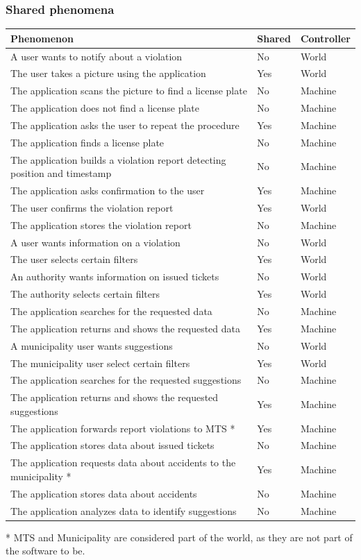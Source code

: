 \documentclass[a4paper]{article}
\begin{document}
\subsubsection{Shared phenomena}

\begin{table}[H]
\centering
\begin{tabularx}{\textwidth}{|X|l|l|}
\hline
Phenomenon & Shared & Controller\tabularnewline
\hline
A user wants to notify about a violation & No & World\tabularnewline
The user takes a picture using the application & Yes &
World\tabularnewline
The application scans the picture to find a license plate & No &
Machine\tabularnewline
The application does not find a license plate & No &
Machine\tabularnewline
The application asks the user to repeat the procedure & Yes &
Machine\tabularnewline
The application finds a license plate & No & Machine\tabularnewline
The application builds a violation report detecting position and
timestamp & No & Machine\tabularnewline
The application asks confirmation to the user & Yes &
Machine\tabularnewline
The user confirms the violation report & Yes & World\tabularnewline
The application stores the violation report & No &
Machine\tabularnewline
A user wants information on a violation & No & World\tabularnewline
The user selects certain filters & Yes & World\tabularnewline
An authority wants information on issued tickets & No &
World\tabularnewline
The authority selects certain filters & Yes & World\tabularnewline
The application searches for the requested data & No &
Machine\tabularnewline
The application returns and shows the requested data & Yes &
Machine\tabularnewline
A municipality user wants suggestions & No & World\tabularnewline
The municipality user select certain filters & Yes &
World\tabularnewline
The application searches for the requested suggestions & No &
Machine\tabularnewline
The application returns and shows the requested suggestions & Yes &
Machine\tabularnewline
The application forwards report violations to MTS * & Yes &
Machine\tabularnewline
The application stores data about issued tickets & No &
Machine\tabularnewline
The application requests data about accidents to the municipality * &
Yes & Machine\tabularnewline
The application stores data about accidents & No &
Machine\tabularnewline
The application analyzes data to identify suggestions & No &
Machine\tabularnewline
\hline
\end{tabularx}
\end{table}

* MTS and Municipality are considered part of the world, as they are not
part of the software to be.
\end{document}
